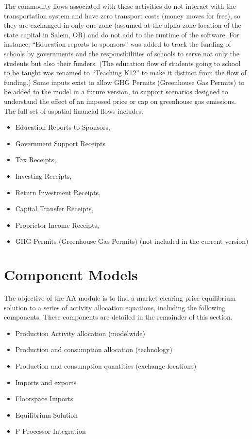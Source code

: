 The commodity flows associated with these activities do not interact with the transportation system and have zero transport costs (money moves for free), so they are exchanged in only one zone (assumed at the alpha zone location of the state capital in Salem, OR) and do not add to the runtime of the software. For instance, ``Education reports to sponsors'' was added to track the funding of schools by governments and the responsibilities of schools to serve not only the students but also their funders. (The education flow of students going to school to be taught was renamed to ``Teaching K12'' to make it distinct from the flow of funding.)  Some inputs exist to allow GHG Permits (Greenhouse Gas Permits) to be added to the model in a future version, to support scenarios designed to understand the effect of an imposed price or cap on greenhouse gas emissions. The full set of aspatial financial flows includes:
\begin{itemize}
\item Education Reports to Sponsors,
\item Government Support Receipts
\item Tax Receipts,
\item Investing Receipts, 
\item Return Investment Receipts,
\item Capital Transfer Receipts,
\item Proprietor Income Receipts,
\item GHG Permits (Greenhouse Gas Permits) (not included in the current version)
\end{itemize}

\section{Component Models}

The objective of the AA module is to find a market clearing price equilibrium solution to a series of activity allocation equations, including the following components. These components are detailed in the remainder of this section.
\begin{itemize}
\item Production Activity allocation (modelwide)
\item Production and consumption allocation (technology)
\item Production and consumption quantities (exchange locations)
\item Imports and exports
\item Floorspace Imports
\item Equilibrium Solution
\item P-Processor Integration
\end{itemize}

